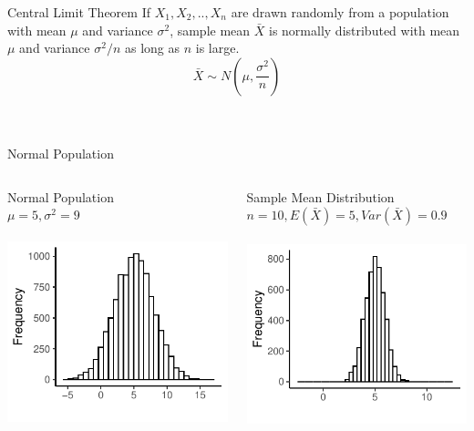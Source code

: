 \documentclass{./../div_teaching_slides}
\begin{document}
\begin{frame}{Central Limit Theorem}
\vspace{2em}
If $X_1, X_2,..,X_n$ are drawn randomly from a population with mean $\mu$ and variance $\sigma^2$, sample mean $\bar{X}$ is normally distributed with mean $\mu$ and variance $\sigma^2/n$ as long as $n$ is large.
$$\bar{X} \sim N\left(\mu, \dfrac{\sigma^2}{n}\right)$$ \\~\\
\href{https://dbhagia.shinyapps.io/CLT-Demo/}{}
\end{frame}

\begin{frame}{Normal Population}
\centering
\begin{columns}
\begin{column}{0.475\textwidth}
\centering
Normal Population \\ $\mu=5, \sigma^2 = 9$ \\~\\
\includegraphics{./../../output/clt_norm_pop.pdf}
\end{column}
\begin{column}{0.475\textwidth}
\centering
Sample Mean Distribution \\ $n=10, E(\bar{X})=5, Var(\bar{X}) = 0.9$ \\~\\
\includegraphics{./../../output/clt_norm_samp_n10.pdf}
\end{column}
\end{columns}
\end{frame}
\end{document}
